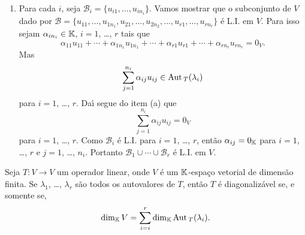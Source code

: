 \begin{prova}
\begin{enumerate}[label={\roman*})]
		Aplicando $T$ em \eqref{equacaoauxiliar1} obtemos
		\begin{equation}\label{equacaoauxiliar2}
			0_V = T(u_1) + T(u_2) + \cdots + T(u_r) = \lambda_1u_1 + \lambda_2u_2 + \cdots + \lambda_ru_r.
		\end{equation}
		Agora multiplicando \eqref{equacaoauxiliar1} por $\lambda_1$ e subtraindo de \eqref{equacaoauxiliar2} obtemos
		\begin{align*}
			\lambda_1u_2 + \lambda_1u_r - \lambda_2u_2 - \cdots - \lambda_ru_r = 0_V\\
			(\lambda_1 - \lambda_2)u_2 - \cdots - (\lambda_1 - \lambda_r)u_r = 0_V.
		\end{align*}
		Mas por hip\'otese de indu\c{c}\~ao, segue que $(\lambda_1 - \lambda_i)u_i = 0$ para $i = 2$, \dots, $r$. Como $\lambda_i \ne \lambda_j$ se $i \ne j$, ent\~ao $\lambda_1 - \lambda_i \ne 0_\cp{K}$ e ent\~ao $u_i = 0_V$ para $i = 2$, \dots, $r$. Logo $u_1 = 0_V$ e o resultado est\'a provado.
		\item Para cada $i$, seja $\mathcal{B}_i = \{u_{i1}, \dots, u_{in_i}\}$. Vamos mostrar que o subconjunto de $V$ dado por $\mathcal{B} = \{u_{11}, \dots, u_{1n_1}, u_{21}, \dots, u_{2n_2}, \dots, u_{r1}, \dots, u_{rn_r}\}$ \'e L.I. em $V$. Para isso sejam $\alpha_{in_i} \in \mathbb{K}$, $i = 1$, \dots, $r$ tais que
		\[
			\alpha_{11}u_{11} + \cdots + \alpha_{1n_1}u_{1n_1} + \cdots + \alpha_{r1}u_{r1} + \cdots + \alpha_{rn_r}u_{rn_r} = 0_V.
		\]
		Mas
		\[
			\sum_{j = 1}^{n_i}\alpha_{ij}u_{ij} \in {\rm Aut\,}_T(\lambda_i)
		\]
		para $i = 1$, \dots, $r$. Da{\'\i} segue do item (a) que
		\[
			\sum_{j = 1}^{n_i}\alpha_{ij}u_{ij} = 0_V
		\]
		para $i = 1$, \dots, $r$. Como $\mathcal{B}_i$ \'e L.I. para $i = 1$, \dots, $r$, ent\~ao $\alpha_{ij} = 0_{\mathbb{K}}$ para $i = 1$, \dots, $r$ e $j = 1$, \dots, $n_i$. Portanto $\mathcal{B}_1 \cup \cdots \cup \mathcal{B}_r$ \'e L.I. em $V$.
	\end{enumerate}
\end{prova}

\begin{corolario}
	Seja $T : V \to V$ um operador linear, onde $V$ \'e um $\mathbb{K}$-espa\c{c}o vetorial de dimens\~ao finita. Se $\lambda_1$, \dots, $\lambda_r$ s\~ao todos os autovalores de $T$, ent\~ao $T$ \'e diagonaliz\'avel se, e somente se,
	\[
		\dim_{\mathbb{K}} V = \sum_{i = i}^r\dim_{\mathbb{K}}{\rm Aut\,}_T(\lambda_i).
	\]
\end{corolario}

